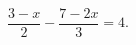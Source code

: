 \begin{ex}[type=equation]
	\begin{condition}
		$\dfrac{3-x}{2}-\dfrac{7-2x}{3}=4.$
	\end{condition}
\end{ex}